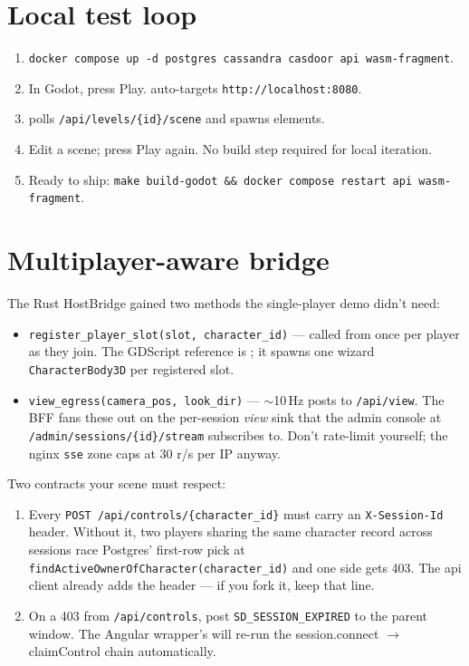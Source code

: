 \documentclass[11pt,a4paper,openany]{book}
\begin{document}
\chapter{Local test loop}
\begin{enumerate}
  \item \texttt{docker compose up -d postgres cassandra casdoor api wasm-fragment}.
  \item In Godot, press Play.  auto-targets
        \texttt{http://localhost:8080}.
  \item {} polls
        \texttt{/api/levels/\{id\}/scene} and spawns elements.
  \item Edit a scene; press Play again. No build step required for
        local iteration.
  \item Ready to ship: \texttt{make build-godot \&\& docker compose
        restart api wasm-fragment}.
\end{enumerate}

\chapter{Multiplayer-aware bridge}
The Rust HostBridge gained two methods the single-player demo didn't
need:

\begin{itemize}
  \item \texttt{register\_player\_slot(slot, character\_id)} ---
        called from 
        once per player as they join. The GDScript reference is
        ; it spawns one wizard
        \texttt{CharacterBody3D} per registered slot.
  \item \texttt{view\_egress(camera\_pos, look\_dir)} --- $\sim$10\,Hz
        posts to \texttt{/api/view}. The BFF fans these out on the
        per-session \emph{view} sink that the admin console at
        \texttt{/admin/sessions/\{id\}/stream} subscribes to. Don't
        rate-limit yourself; the nginx \texttt{sse} zone caps at
        30 r/s per IP anyway.
\end{itemize}

Two contracts your scene must respect:

\begin{enumerate}
  \item Every \texttt{POST /api/controls/\{character\_id\}} must
        carry an \texttt{X-Session-Id} header. Without it, two players
        sharing the same character record across sessions race
        Postgres' first-row pick at
        \texttt{findActiveOwnerOfCharacter(character\_id)} and one
        side gets 403. The  api client
        already adds the header --- if you fork it, keep that line.
  \item On a 403 from \texttt{/api/controls}, post
        \texttt{SD\_SESSION\_EXPIRED} to the parent window. The
        Angular wrapper's 
        will re-run the session.connect $\rightarrow$ claimControl
        chain automatically.
\end{enumerate}
\end{document}
